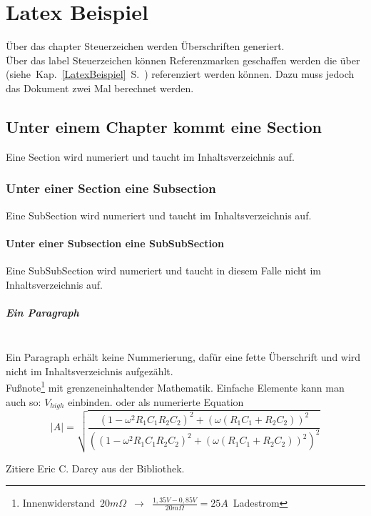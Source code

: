 \chapter{Latex Beispiel}
\thispagestyle{fancy}
\label{LatexBeispiel}
Über das chapter Steuerzeichen werden Überschriften generiert.\\
Über das label Steuerzeichen können Referenzmarken geschaffen werden die über \mbox{(siehe Kap. \ref{LatexBeispiel}  S. \pageref{LatexBeispiel})} referenziert werden können.
Dazu muss jedoch das Dokument zwei Mal berechnet werden.
\section{Unter einem Chapter kommt eine Section}
Eine Section wird numeriert und taucht im Inhaltsverzeichnis auf.
\subsection{Unter einer Section eine Subsection}
Eine SubSection wird numeriert und taucht im Inhaltsverzeichnis auf.
\subsubsection{Unter einer Subsection eine SubSubSection}
Eine SubSubSection wird numeriert und taucht in diesem Falle nicht im Inhaltsverzeichnis auf.
\paragraph{Ein Paragraph}$\;$\\
Ein Paragraph erhält keine Nummerierung, dafür eine fette Überschrift und wird nicht im Inhaltsverzeichnis aufgezählt.
\\ %
Fußnote\footnote{\mbox{Innenwiderstand $20m\Omega$ $\rightarrow$ $\frac{1,35V-0,85V}{20m\Omega}=25A$ Ladestrom}} mit grenzeneinhaltender Mathematik.
Einfache Elemente kann man auch so: $V_{high}$ einbinden.
oder als numerierte Equation
\begin{equation} \label{eq:Tiefpass24}
|A|=\sqrt{\frac{(1-\omega^{2}R_{1}C_{1}R_{2}C_{2})^{2}+(\omega(R_{1}C_{1}+R_{2}C_{2}))^{2}}{\left( (1-\omega^{2}R_{1}C_{1}R_{2}C_{2})^{2}+(\omega(R_{1}C_{1}+R_{2}C_{2}))^{2}\right)^{2}}}
\end{equation}

Zitiere Eric C. Darcy\cite{Darcy} aus der Bibliothek.

